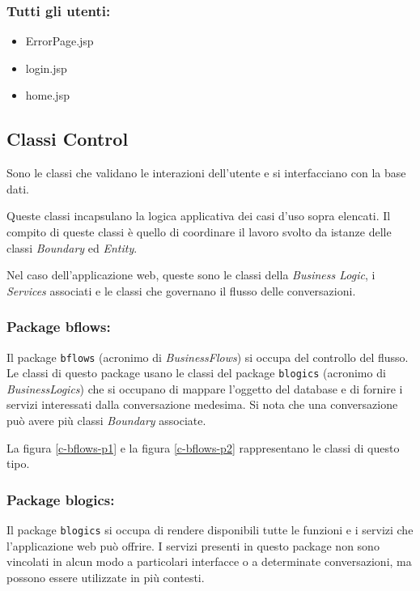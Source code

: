 	\subsubsection*{Tutti gli utenti:}
	
	\begin{itemize}
		\item ErrorPage.jsp
		\item login.jsp
		\item home.jsp	
	\end{itemize}
	
	\subsection{Classi Control}
	Sono le classi che validano le interazioni dell'utente e si interfacciano con la base dati.
	
	Queste classi incapsulano la logica applicativa dei casi d'uso sopra elencati. Il compito di queste classi è quello di coordinare il lavoro svolto da istanze delle classi \emph{Boundary} ed \emph{Entity}.
	
	Nel caso dell'applicazione web, queste sono le classi della \emph{Business Logic}, i \emph{Services} associati e le classi che governano il flusso delle conversazioni.
	
	\subsubsection*{Package bflows:}
	Il package \texttt{bflows} (acronimo di \emph{BusinessFlows}) si occupa del controllo del flusso.
	Le classi di questo package usano le classi del package \texttt{blogics} (acronimo di \emph{BusinessLogics}) che si occupano di mappare l'oggetto del database e di fornire i servizi interessati dalla conversazione medesima.
	Si nota che una conversazione può avere più classi \emph{Boundary} associate.
	
	La figura \vref{c-bflows-p1} e la figura \vref{c-bflows-p2} rappresentano le classi di questo tipo.
	
	\subsubsection*{Package blogics:}
	Il package \texttt{blogics} si occupa di rendere disponibili tutte le funzioni e i servizi che l'applicazione web può offrire.
	I servizi presenti in questo package non sono vincolati in alcun modo a particolari interfacce o a determinate conversazioni, ma possono essere utilizzate in più contesti.
	
